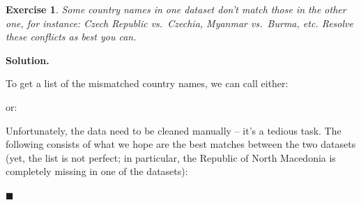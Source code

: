 \documentclass[10pt,b5paper,krantz1]{krantz}
\newenvironment{Shaded}{\begin{snugshade}}{\end{snugshade}}
\newcommand{\NormalTok}[1]{#1}
\newcommand{\OperatorTok}[1]{\textcolor[rgb]{0.43,0.43,0.43}{\textbf{#1}}}
\newcommand{\StringTok}[1]{\textcolor[rgb]{0.5,0.5,0.5}{#1}}
\newtheorem{exercise}{Exercise}[chapter]
\newenvironment{solution}{%
\bigskip\noindent\textbf{Solution. }%
\it\ignorespaces%
\ignorespaces%
}{\ignorespaces%
\hfill$\blacksquare$%
}
\begin{document}
\begin{exercise}

Some country names in one dataset don't match those in the other
one, for instance: Czech Republic vs.~Czechia,
Myanmar vs.~Burma, etc. Resolve these conflicts as best you can.

\end{exercise}

\begin{solution}

To get a list of the mismatched country names, we can call either:

\begin{Shaded}
\end{Shaded}

or:

\begin{Shaded}
\end{Shaded}

Unfortunately, the data need to be cleaned manually -- it's a tedious task.
The following consists of what we hope are the best matches
between the two datasets (yet, the list is not perfect;
in particular, the Republic of North Macedonia
is completely missing in one of the datasets):


\end{solution}
\end{document}

